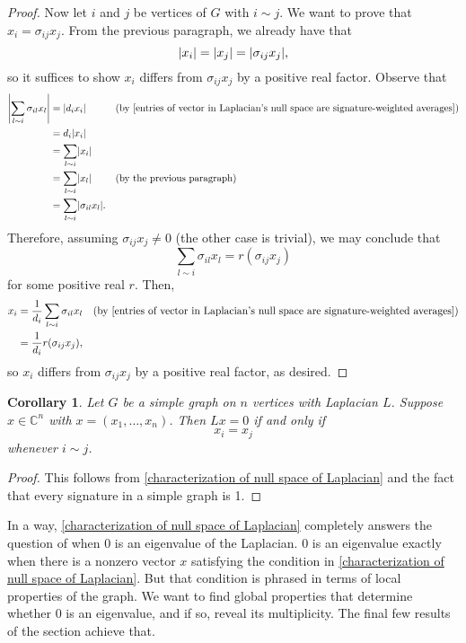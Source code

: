 \documentclass[12pt]{article}
\newtheorem{corollary}[thm]{Corollary}
\theoremstyle{definition}
\newcommand{\C}{\mathbb C}
\DeclarePairedDelimiter\abs{\lvert}{\rvert}
\begin{document}
\begin{proof}
Now let $i$ and $j$ be vertices of $G$ with $i \sim j$. We want to prove that $x_i = \sigma_{ij}x_j$. From the previous paragraph, we already have that
$$\abs*{x_i} = \abs*{x_j} = \abs*{\sigma_{ij} x_j},$$
so it suffices to show $x_i$ differs from $\sigma_{ij} x_j$ by a positive real factor. Observe that 
\begin{align*}
\abs*{\sum_{l \sim i} \sigma_{il}x_l} &= \abs*{d_i x_i} && \text{(by \cref{entries of vector in Laplacian's null space are signature-weighted averages})} \\
&= d_i \abs*{x_i} \\
&= \sum_{l \sim i} \abs*{x_i} \\
&= \sum_{l \sim i} \abs*{x_l} && \text{(by the previous paragraph)} \\
&= \sum_{l \sim i} \abs*{\sigma_{il} x_l}.
\end{align*}
Therefore, assuming $\sigma_{ij} x_j \neq 0$ (the other case is trivial), we may conclude that 
$$\sum_{l \sim i} \sigma_{il}x_l = r (\sigma_{ij}x_j)$$
for some positive real $r$. Then,
\begin{align*}
x_i &= \frac{1}{d_i} \sum_{l \sim i} \sigma_{il}x_l && \text{(by \cref{entries of vector in Laplacian's null space are signature-weighted averages})} \\
&= \frac{1}{d_i} r (\sigma_{ij}x_j),
\end{align*}
so $x_i$ differs from $\sigma_{ij}x_j$ by a positive real factor, as desired.
\end{proof}

\begin{corollary}\label{null space of simple graph Laplacian}
Let $G$ be a simple graph on $n$ vertices with Laplacian $L$. Suppose $x \in \C^n$ with $x = (x_1, \dots, x_n)$. Then $Lx = 0$ if and only if $$x_i = x_j$$ whenever $i \sim j$.
\end{corollary}
\begin{proof}
This follows from \cref{characterization of null space of Laplacian} and the fact that every signature in a simple graph is 1.
\end{proof}

In a way, \cref{characterization of null space of Laplacian} completely answers the question of when 0 is an eigenvalue of the Laplacian. 0 is an eigenvalue exactly when there is a nonzero vector $x$ satisfying the condition in \cref{characterization of null space of Laplacian}. But that condition is phrased in terms of local properties of the graph. We want to find global properties that determine whether 0 is an eigenvalue, and if so, reveal its multiplicity. The final few results of the section achieve that.
\end{document}
